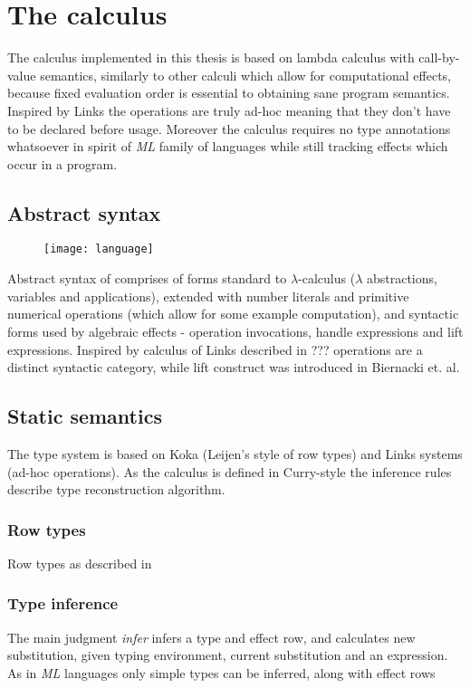 \documentclass[inz, english, shortabstract]{iithesis}
\newcommand{\LC}{\(\lambda\)-calculus }
\begin{document}
\chapter{The calculus}
The calculus implemented in this thesis is based on lambda calculus with call-by-value semantics, similarly to other calculi which allow for computational effects, because fixed evaluation order is essential to obtaining sane program semantics.
Inspired by Links \cite{Hillerstrom2016} the operations are truly ad-hoc meaning that they don't have to be declared before usage.
Moreover the calculus requires no type annotations whatsoever in spirit of \emph{ML} family of languages while still tracking effects which occur in a program.

\section{Abstract syntax}
\begin{figure}
  \centering
  \texttt{[image: language]}
\end{figure}
Abstract syntax of comprises of forms standard to \LC ($\lambda$ abstractions, variables and applications), extended with number literals and primitive numerical operations (which allow for some example computation), and syntactic forms used by algebraic effects - operation invocations, handle expressions and lift expressions.
Inspired by calculus of Links described in ??? operations are a distinct syntactic category, while lift construct was introduced in Biernacki et. al. %

\section{Static semantics}
The type system is based on Koka (Leijen's style of row types) and Links systems (ad-hoc operations).
As the calculus is defined in Curry-style the inference rules describe type reconstruction algorithm.

\subsection{Row types}
Row types as described in \cite{Leijen2005}

\subsection{Type inference}
The main judgment \emph{infer} infers a type and effect row, and calculates new substitution, given typing environment, current substitution and an expression.
As in \emph{ML} languages only simple types can be inferred, along with effect rows 
\end{document}
